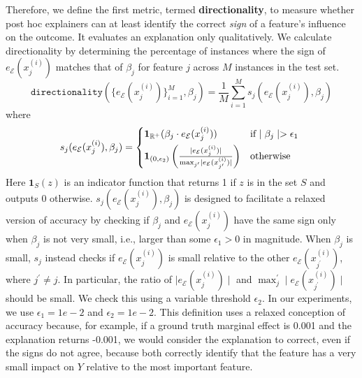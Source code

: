 \documentclass[12pt]{article}  %
\newcommand{\mE}{\mathcal{E}}
\begin{document}
    Therefore, we define the first metric, termed \textbf{directionality}, to measure whether post hoc explainers can at least identify the correct \textit{sign} of a feature's influence on the outcome. It evaluates an explanation only qualitatively. We calculate directionality by determining the percentage of instances where the sign of $e_\mE(x^{(i)}_j)$ matches that of $\beta_j$ for feature $j$ across $M$ instances in the test set. %
    \begin{equation}
        \label{eq:acc}
        \texttt{directionality}(\{e_\mE(x^{(i)}_j)\}_{i=1}^M,\beta_j) = \frac{1}{M} \sum_{i=1}^M s_j( e_\mE(x^{(i)}_j),\beta_j)
    \end{equation}
    where 
    \begin{equation*}
        s_j(e_\mE(x^{(i)}_j),\beta_j) = \begin{cases*}
                    \mathbf{1}_{\mathbb{R}^+}(\beta_j \cdot e_\mE(x^{(i)}_j)) & if  $\mid \beta_j\mid > \epsilon_1$  \\
                     \mathbf{1}_{(0,\epsilon_2)}\left(\frac{\mid e_\mE(x^{(i)}_j)\mid }{\max_{j'} \mid e_\mE(x^{(i)}_{j'})\mid}\right) & otherwise
                 \end{cases*}
    \end{equation*}
    Here $\mathbf{1}_S(z)$ is an indicator function that returns 1 if $z$ is in the set $S$ and outputs 0 otherwise. $s_j(e_\mE(x^{(i)}_j),\beta_j)$ is designed to facilitate a relaxed version of accuracy by checking if $\beta_j$ and $e_\mE(x^{(i)}_j)$ have the same sign only when $\beta_j$ is not very small, i.e., larger than some $\epsilon_1> 0$ in magnitude. When $\beta_j$ is small, $s_j$ instead checks if $e_\mE(x^{(i)}_j)$ is small relative to the other $e_\mE(x^{(i)}_{j^{\prime}})$, where $j^\prime \neq j$. In particular, the ratio of $\mid e_\mE(x^{(i)}_j)\mid $ and $\max_j^\prime \mid e_\mE(x^{(i)}_{j^\prime})\mid$ should be small. We check this using a variable threshold $\epsilon_2$. In our experiments, we use $\epsilon_1=1e-2$ and $\epsilon_2=1e-2$. This definition uses a relaxed conception of accuracy because, for example, if a ground truth marginal effect is 0.001 and the explanation returns -0.001, we would consider the explanation to correct, even if the signs do not agree, because both correctly identify that the feature has a very small impact on $Y$ relative to the most important feature.
    
\end{document}
